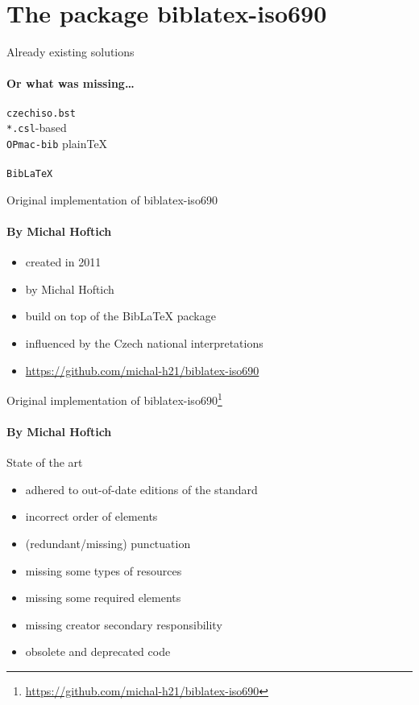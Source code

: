 \documentclass{beamer}
\begin{document}
\section{The package biblatex-iso690}

\begin{frame}{Already existing solutions}
\framesubtitle{Or what was missing\dots}

\texttt{czechiso.bst}\\
\texttt{*.csl}-based\\
\texttt{OPmac-bib} plainTeX\\
\\
\texttt{BibLaTeX}

\end{frame}

\begin{frame}{Original implementation of \textsf{biblatex-iso690}}
\framesubtitle{By Michal Hoftich}
\begin{itemize}
\item created in 2011
\item by Michal Hoftich
\item build on top of the BibLaTeX package
\item influenced by the Czech national interpretations
\item \url{https://github.com/michal-h21/biblatex-iso690}
\end{itemize}
\end{frame}

\begin{frame}{Original implementation of \textsf{biblatex-iso690}\footnote[frame]{\url{https://github.com/michal-h21/biblatex-iso690}}}
\framesubtitle{By Michal Hoftich}
State of the art
\begin{itemize}
\item adhered to out-of-date editions of the standard %
\item incorrect order of elements %
\item (redundant/missing) punctuation %
\item missing some types of resources %
\item missing some required elements %
\item missing creator secondary responsibility %
\item obsolete and deprecated code %
\end{itemize}
\end{frame}
\end{document}
